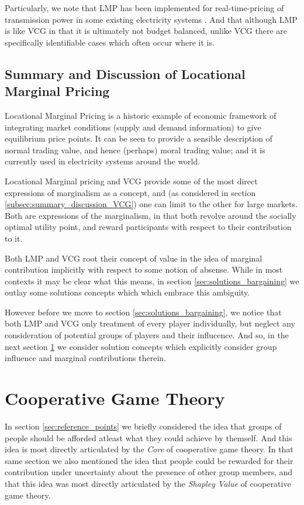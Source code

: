 Particularly, we note that LMP has been implemented for real-time-pricing of transmission power in some existing electricity systems \cite{WANG2015695,zonal}.
And that although LMP is like VCG in that it is ultimately not budget balanced, unlike VCG there are specifically identifiable cases which often occur where it is.\cite{lmp2}


\subsection{Summary and Discussion of Locational Marginal Pricing}

Locational Marginal Pricing is a historic example of economic framework of integrating market conditions (supply and demand information) to give equilibrium price points.
It can be seen to provide a sensible description of normal trading value, and hence (perhaps) moral trading value; and it is currently used in electricity systems around the world.

Locational Marginal pricing and VCG provide some of the most direct expressions of marginalism as a concept, and (as considered in section \ref{subsec:summary_discussion_VCG}) one can limit to the other for large markets.
Both are expressions of the marginalism, in that both revolve around the socially optimal utility point, and reward participants with respect to their contribution to it.

Both LMP and VCG root their concept of value in the idea of marginal contribution implicitly with respect to some notion of absense. While in most contexts it may be clear what this means, in section \ref{sec:solutions_bargaining} we outlay some solutions concepts which which embrace this ambiguity.

However before we move to section \ref{sec:solutions_bargaining}, we notice that both LMP and VCG only treatment of every player individually, but neglect any consideration of potential groups of players and their influcence.
And so, in the next section \ref{sec:cooperative_game_theory_part} we consider solution concepts which explicitly consider group influence and marginal contributions therein.



\section{Cooperative Game Theory}\label{sec:cooperative_game_theory_part}

In section \ref{sec:reference_points} we briefly considered the idea that groups of people should be afforded atleast what they could achieve by themself.
And this idea is most directly articulated by the \textit{Core} of cooperative game theory.
In that same section we also mentioned the idea that people could be rewarded for their contribution under uncertainty about the presence of other group members, and that this idea was most directly articulated by the \textit{Shapley Value} of cooperative game theory.


